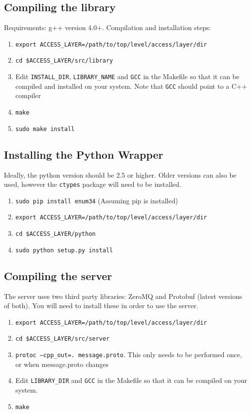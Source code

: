 \documentclass[a4paper,11pt]{article}
\begin{document}
\subsection*{Compiling the library}

Requirements: g++ version 4.0+. Compilation and installation steps:
\begin{enumerate}
 \item \texttt{export ACCESS\_LAYER=/path/to/top/level/access/layer/dir}
 \item \texttt{cd \$ACCESS\_LAYER/src/library}
 \item Edit \texttt{INSTALL\_DIR}, \texttt{LIBRARY\_NAME} and \texttt{GCC} in 
the Makefile so that it can be compiled and installed on your system. Note that 
\texttt{GCC} should point to a C++ compiler
 \item \texttt{make}
 \item \texttt{sudo make install}
\end{enumerate}

\subsection*{Installing the Python Wrapper}

Ideally, the python version should be 2.5 or higher. Older versions can also be 
used, however the \texttt{ctypes} package will need to be installed. 

\begin{enumerate}
 \item \texttt{sudo pip install enum34} (Assuming pip is installed)
 \item \texttt{export ACCESS\_LAYER=/path/to/top/level/access/layer/dir}
 \item \texttt{cd \$ACCESS\_LAYER/python}
 \item \texttt{sudo python setup.py install}
\end{enumerate}


\subsection*{Compiling the server}

The server uses two third party libraries: ZeroMQ and Protobuf (latest versions 
of both). You will need to install these in order to use the server.

\begin{enumerate}
 \item \texttt{export ACCESS\_LAYER=/path/to/top/level/access/layer/dir}
 \item \texttt{cd \$ACCESS\_LAYER/src/server}
 \item \texttt{protoc --cpp\_out=. message.proto}. This only needs to be 
performed once, or when message.proto changes
 \item Edit \texttt{LIBRARY\_DIR} and \texttt{GCC} in the Makefile so that it 
can be compiled on your system.
 \item \texttt{make}
\end{enumerate}
\end{document}
